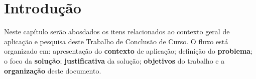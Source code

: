 \chapter{Introdução}
\label{chap:intro}

Neste capítulo serão abosdados os itens relacionados ao contexto geral de
aplicação e pesquisa deste Trabalho de Conclusão de Curso. O fluxo está
organizado em: apresentação do \textbf{contexto} de aplicação; definição do
\textbf{problema}; o foco da \textbf{solução}; \textbf{justificativa} da solução; \textbf{objetivos}
do trabalho e a \textbf{organização} deste documento.





